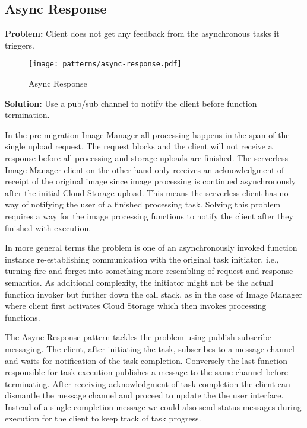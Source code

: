 \subsection{Async Response} \label{subsec:AsyncResponse}

\textbf{Problem:} Client does not get any feedback from the asynchronous tasks it triggers.

\begin{figure}[h]
  \centering
  \texttt{[image: patterns/async-response.pdf]}
  \caption{Async Response}
  \label{fig:asyncResponse}
\end{figure}

\textbf{Solution:} Use a pub/sub channel to notify the client before function termination.

In the pre-migration Image Manager all processing happens in the span of the single upload request. The request blocks and the client will not receive a response before all processing and storage uploads are finished. The serverless Image Manager client on the other hand only receives an acknowledgment of receipt of the original image since image processing is continued asynchronously after the initial Cloud Storage upload. This means the serverless client has no way of notifying the user of a finished processing task. Solving this problem requires a way for the image processing functions to notify the client after they finished with execution.

In more general terms the problem is one of an asynchronously invoked function instance re-establishing communication with the original task initiator, i.e., turning fire-and-forget into something more resembling of request-and-response semantics. As additional complexity, the initiator might not be the actual function invoker but further down the call stack, as in the case of Image Manager where client first activates Cloud Storage which then invokes processing functions.

The Async Response pattern tackles the problem using publish-subscribe messaging. The client, after initiating the task, subscribes to a message channel and waits for notification of the task completion. Conversely the last function responsible for task execution publishes a message to the same channel before terminating. After receiving acknowledgment of task completion the client can dismantle the message channel and proceed to update the the user interface. Instead of a single completion message we could also send status messages during execution for the client to keep track of task progress.


